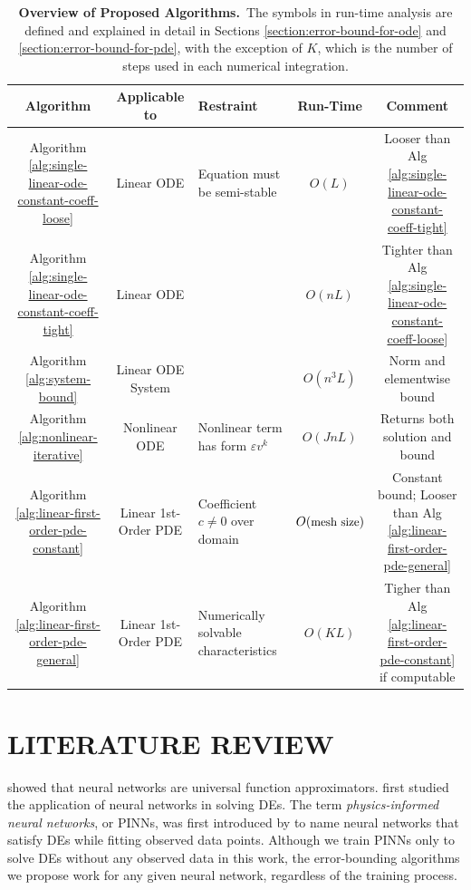 \documentclass[accepted]{uai2023}
\begin{document}
    \begin{table}[tbh]
        \centering
        \caption{\textbf{Overview of Proposed Algorithms.}\, The symbols in run-time analysis are defined and explained in detail in Sections \ref{section:error-bound-for-ode} and \ref{section:error-bound-for-pde}, with the exception of $K$, which is the number of steps used in each numerical integration.}
        \label{tab:alogrithm-overview}
        \small
        \begin{tabularx}{\textwidth}{ccXcc}
          \toprule %
          \bfseries Algorithm & \bfseries Applicable to & \bfseries Restraint & \bfseries Run-Time & \bfseries Comment \\
          \midrule %
          Algorithm \ref{alg:single-linear-ode-constant-coeff-loose} & Linear ODE & Equation must be semi-stable & $O(L)$ & Looser than Alg \ref{alg:single-linear-ode-constant-coeff-tight}\\
          Algorithm \ref{alg:single-linear-ode-constant-coeff-tight} & Linear ODE &  & $O(nL)$ & Tighter than Alg \ref{alg:single-linear-ode-constant-coeff-loose}\\
          Algorithm \ref{alg:system-bound} & Linear ODE System &  & $O(n^3 L)$ & Norm and elementwise bound\\
          Algorithm \ref{alg:nonlinear-iterative} & Nonlinear ODE & Nonlinear term has form $\varepsilon v^k$ & $O(JnL)$ & Returns both solution and bound \\
          Algorithm \ref{alg:linear-first-order-pde-constant} & Linear 1st-Order PDE & Coefficient $c \neq 0$ over domain & $O(\text{\small mesh size})$ & Constant bound; Looser than Alg \ref{alg:linear-first-order-pde-general}\\
          Algorithm \ref{alg:linear-first-order-pde-general} & Linear 1st-Order PDE & Numerically solvable characteristics & $O(KL)$ & Tigher than Alg \ref{alg:linear-first-order-pde-constant} if computable\\
          \bottomrule %
        \end{tabularx}
    \end{table}

\section{LITERATURE REVIEW} \label{section:literature-review}
    \cite{hornik1989multilayer} showed that neural networks are universal function approximators. 
    \cite{lagaris1998artificial} first studied the application of neural networks in solving DEs.
    The term \textit{physics-informed neural networks}, or PINNs, was first introduced by \cite{raissi2019physics} to name neural networks that satisfy DEs while fitting observed data points. 
    Although we train PINNs only to solve DEs without any observed data in this work, the error-bounding algorithms we propose work for any given neural network, regardless of the training process.
\end{document}
